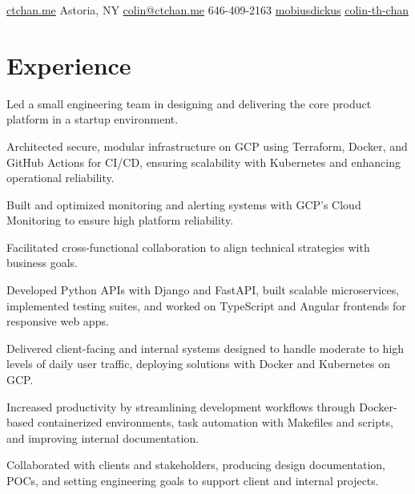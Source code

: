 \documentclass[]{plushcv}
\begin{document}
%
%
{
  \contactline
  {\href{https://ctchan.me}{ctchan.me}}
  {Astoria, NY}
  {\href{mailto:colin@ctchan.me}{colin@ctchan.me}}
  {646-409-2163}
  {\href{https://www.github.com/mobiusdickus}{mobiusdickus}}
  {\href{https://www.linkedin.com/in/colin-th-chan/}{colin-th-chan}}
}

%
%

\begin{minipage}[t]{0.70\textwidth} 



\section{Experience}
\vspace{\topsep} %
\begin{tightemize}
\sectionsep
\item Led a small engineering team in designing and delivering the core product platform in a startup environment.
\item Architected secure, modular infrastructure on GCP using Terraform, Docker, and GitHub Actions for CI/CD, ensuring scalability with Kubernetes and enhancing operational reliability.
\item Built and optimized monitoring and alerting systems with GCP’s Cloud Monitoring to ensure high platform reliability.
\item Facilitated cross-functional collaboration to align technical strategies with business goals.
\end{tightemize}
\sectionsep

\begin{tightemize}
\sectionsep
\item Developed Python APIs with Django and FastAPI, built scalable microservices, implemented testing suites, and worked on TypeScript and Angular frontends for responsive web apps.
\item Delivered client-facing and internal systems designed to handle moderate to high levels of daily user traffic, deploying solutions with Docker and Kubernetes on GCP.
\item Increased productivity by streamlining development workflows through Docker-based containerized environments, task automation with Makefiles and scripts, and improving internal documentation.
\item Collaborated with clients and stakeholders, producing design documentation, POCs, and setting engineering goals to support client and internal projects.
\end{tightemize}
\sectionsep


\end{minipage}
\end{document}
